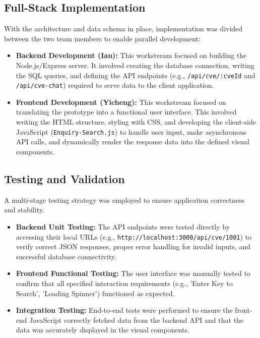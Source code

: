 \documentclass[12pt,a4paper]{article}
\begin{document}
    \subsection{Full-Stack Implementation}
    With the architecture and data schema in place, implementation was divided between the two team members to enable parallel development:
    \begin{itemize}[label=$\bullet$, leftmargin=*]
        \item \textbf{Backend Development (Ian):} This workstream focused on building the Node.js/Express server. It involved creating the database connection, writing the SQL queries, and defining the API endpoints (e.g., \texttt{/api/cve/:cveId} and \texttt{/api/cve-chat}) required to serve data to the client application.
        \item \textbf{Frontend Development (Yicheng):} This workstream focused on translating the prototype into a functional user interface. This involved writing the HTML structure, styling with CSS, and developing the client-side JavaScript (\texttt{Enquiry-Search.js}) to handle user input, make asynchronous API calls, and dynamically render the response data into the defined visual components.
    \end{itemize}
    \subsection{Testing and Validation}
    A multi-stage testing strategy was employed to ensure application correctness and stability.
    \begin{itemize}[label=$\bullet$, leftmargin=*]
        \item \textbf{Backend Unit Testing:} The API endpoints were tested directly by accessing their local URLs (e.g., \texttt{http://localhost:3000/api/cve/1001}) to verify correct JSON responses, proper error handling for invalid inputs, and successful database connectivity.

        \item \textbf{Frontend Functional Testing:} The user interface was manually tested to confirm that all specified interaction requirements (e.g., 'Enter Key to Search', 'Loading Spinner') functioned as expected.

        \item \textbf{Integration Testing:} End-to-end tests were performed to ensure the front-end JavaScript correctly fetched data from the backend API and that the data was accurately displayed in the visual components.
    \end{itemize}
\end{document}
